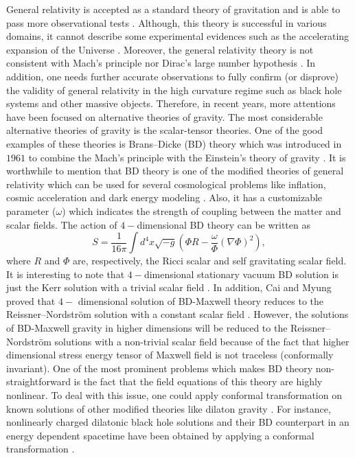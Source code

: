 \documentclass[aps,onecolumn ]{revtex4}
\begin{document}
General relativity is accepted as a standard theory of gravitation
and is able to pass more observational tests \cite{GR}. Although,
this theory is successful in various domains, it cannot describe
some experimental evidences such as the accelerating expansion of
the Universe \cite{Expansion1,Expansion2,Expansion3}. Moreover,
the general relativity theory is not consistent with Mach's
principle nor Dirac's large number hypothesis
\cite{Mach&Dirac1,Mach&Dirac2}. In addition, one needs further
accurate observations to fully confirm (or disprove) the validity
of general relativity in the high curvature regime such as black
hole systems and other massive objects. Therefore, in recent
years, more attentions have been focused on alternative theories
of gravity. The most considerable alternative theories of gravity
is the scalar-tensor theories. One of the good examples of these
theories is Brans--Dicke (BD) theory which was introduced in
$1961$ to combine the Mach's principle with the Einstein's theory
of gravity \cite{BD}. It is worthwhile to mention that BD theory
is one of the modified theories of general relativity which can be
used for several cosmological problems like inflation, cosmic
acceleration and dark energy modeling
\cite{BD-Example1,BD-Example2,BD-Example3}. Also, it has a
customizable parameter ($\omega$) which indicates the strength of
coupling between the matter and scalar fields. The action of
$4-$dimensional BD theory can be written as
\begin{equation}
S=\frac{1}{16\pi }\int d^{4}x\sqrt{-g}\left(\Phi R-\frac{\omega }{\Phi}
(\nabla \Phi)^{2}\right),
\end{equation}
where $R$ and $\Phi$ are, respectively, the Ricci scalar and self
gravitating scalar field. It is interesting to note that $4-$dimensional
stationary vacuum BD solution is just the Kerr solution with a trivial
scalar field \cite{Gao4}. In addition, Cai and Myung proved that $4-$%
dimensional solution of BD-Maxwell theory reduces to the
Reissner--Nordstr\"{o}m solution with a constant scalar field
\cite{sh5a,sh5b,sh55a,sh55b}. However, the solutions of BD-Maxwell
gravity in higher dimensions will be reduced to the
Reissner--Nordstr\"{o}m solutions with a non-trivial scalar field
because of the fact that higher dimensional stress energy tensor
of Maxwell field is not traceless (conformally invariant). One of
the most prominent problems which makes BD theory
non-straightforward is the fact that the field equations of this
theory are highly nonlinear. To deal with this issue, one could
apply conformal transformation on known solutions of other
modified theories like dilaton gravity \cite{Dilaton}. For
instance, nonlinearly charged dilatonic black hole solutions and
their BD counterpart in an energy dependent
spacetime have been obtained by applying a conformal transformation \cite%
{BDvsDilaton}.
\end{document}
